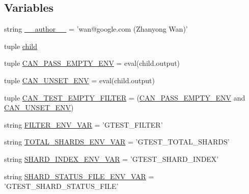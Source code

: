 \subsection*{\-Variables}
\begin{DoxyCompactItemize}
\item 
string \hyperlink{namespacegtest__filter__unittest_a629d61dfe4da763164a4d1a2d85b0afd}{\-\_\-\-\_\-author\-\_\-\-\_\-} = 'wan@google.\-com (\-Zhanyong \-Wan)'
\item 
tuple \hyperlink{namespacegtest__filter__unittest_a74580d02ef7af2ae9bcc43f9032eb7fb}{child}
\item 
tuple \hyperlink{namespacegtest__filter__unittest_ae3ef0abf6b51cd7f1d1f94befe099624}{\-C\-A\-N\-\_\-\-P\-A\-S\-S\-\_\-\-E\-M\-P\-T\-Y\-\_\-\-E\-N\-V} = eval(child.\-output)
\item 
tuple \hyperlink{namespacegtest__filter__unittest_aac5fa3f3d57f4ff7e39b595183306895}{\-C\-A\-N\-\_\-\-U\-N\-S\-E\-T\-\_\-\-E\-N\-V} = eval(child.\-output)
\item 
tuple \hyperlink{namespacegtest__filter__unittest_a4e041dfb4db16373915e8ebdda3d8606}{\-C\-A\-N\-\_\-\-T\-E\-S\-T\-\_\-\-E\-M\-P\-T\-Y\-\_\-\-F\-I\-L\-T\-E\-R} = (\hyperlink{namespacegtest__filter__unittest_ae3ef0abf6b51cd7f1d1f94befe099624}{\-C\-A\-N\-\_\-\-P\-A\-S\-S\-\_\-\-E\-M\-P\-T\-Y\-\_\-\-E\-N\-V} and \hyperlink{namespacegtest__filter__unittest_aac5fa3f3d57f4ff7e39b595183306895}{\-C\-A\-N\-\_\-\-U\-N\-S\-E\-T\-\_\-\-E\-N\-V})
\item 
string \hyperlink{namespacegtest__filter__unittest_a7350585160a9ce9ec6e3f65bc8d8d79e}{\-F\-I\-L\-T\-E\-R\-\_\-\-E\-N\-V\-\_\-\-V\-A\-R} = '\-G\-T\-E\-S\-T\-\_\-\-F\-I\-L\-T\-E\-R'
\item 
string \hyperlink{namespacegtest__filter__unittest_a29eb92c501c01a11bd57180093e5548f}{\-T\-O\-T\-A\-L\-\_\-\-S\-H\-A\-R\-D\-S\-\_\-\-E\-N\-V\-\_\-\-V\-A\-R} = '\-G\-T\-E\-S\-T\-\_\-\-T\-O\-T\-A\-L\-\_\-\-S\-H\-A\-R\-D\-S'
\item 
string \hyperlink{namespacegtest__filter__unittest_a8eb464868f4a78b232279d364ad58b55}{\-S\-H\-A\-R\-D\-\_\-\-I\-N\-D\-E\-X\-\_\-\-E\-N\-V\-\_\-\-V\-A\-R} = '\-G\-T\-E\-S\-T\-\_\-\-S\-H\-A\-R\-D\-\_\-\-I\-N\-D\-E\-X'
\item 
string \hyperlink{namespacegtest__filter__unittest_a70c5f98e5406bb02fa0d5a72bb255454}{\-S\-H\-A\-R\-D\-\_\-\-S\-T\-A\-T\-U\-S\-\_\-\-F\-I\-L\-E\-\_\-\-E\-N\-V\-\_\-\-V\-A\-R} = '\-G\-T\-E\-S\-T\-\_\-\-S\-H\-A\-R\-D\-\_\-\-S\-T\-A\-T\-U\-S\-\_\-\-F\-I\-L\-E'
\item 

\end{DoxyCompactItemize}
